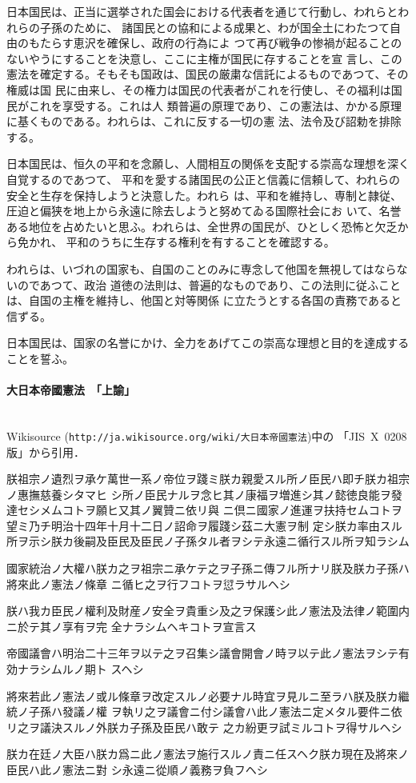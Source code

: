 \documentclass{ltjsarticle}
\begin{document}
{\selectfont
日本国民は、正当に選挙された国会における代表者を通じて行動し、われらとわれらの子孫のために、
諸国民との協和による成果と、わが国全土にわたつて自由のもたらす恵沢を確保し、政府の行為によ
つて再び戦争の惨禍が起ることのないやうにすることを決意し、ここに主権が国民に存することを宣
言し、この憲法を確定する。そもそも国政は、国民の厳粛な信託によるものであつて、その権威は国
民に由来し、その権力は国民の代表者がこれを行使し、その福利は国民がこれを享受する。これは人
類普遍の原理であり、この憲法は、かかる原理に基くものである。われらは、これに反する一切の憲
法、法令及び詔勅を排除する。

日本国民は、恒久の平和を念願し、人間相互の関係を支配する崇高な理想を深く自覚するのであつて、
平和を愛する諸国民の公正と信義に信頼して、われらの安全と生存を保持しようと決意した。われら
は、平和を維持し、専制と隷従、圧迫と偏狭を地上から永遠に除去しようと努めてゐる国際社会にお
いて、名誉ある地位を占めたいと思ふ。われらは、全世界の国民が、ひとしく恐怖と欠乏から免かれ、
平和のうちに生存する権利を有することを確認する。

われらは、いづれの国家も、自国のことのみに専念して他国を無視してはならないのであつて、政治
道徳の法則は、普遍的なものであり、この法則に従ふことは、自国の主権を維持し、他国と対等関係
に立たうとする各国の責務であると信ずる。

日本国民は、国家の名誉にかけ、全力をあげてこの崇高な理想と目的を達成することを誓ふ。
}

\paragraph{大日本帝國憲法　「上諭」}\ \\
Wikisource (\texttt{http://ja.wikisource.org/wiki/大日本帝國憲法})中の
「JIS~X~0208版」から引用．

\medskip

{\selectfont
朕祖宗ノ遺烈ヲ承ケ萬世一系ノ帝位ヲ踐ミ朕カ親愛スル所ノ臣民ハ即チ朕カ祖宗ノ惠撫慈養シタマヒ
シ所ノ臣民ナルヲ念ヒ其ノ康福ヲ増進シ其ノ懿徳良能ヲ發達セシメムコトヲ願ヒ又其ノ翼贊ニ依リ與
ニ倶ニ國家ノ進運ヲ扶持セムコトヲ望ミ乃チ明治十四年十月十二日ノ詔命ヲ履踐シ茲ニ大憲ヲ制
定シ朕カ率由スル所ヲ示シ朕カ後嗣及臣民及臣民ノ子孫タル者ヲシテ永遠ニ循行スル所ヲ知ラシム

國家統治ノ大權ハ朕カ之ヲ祖宗ニ承ケテ之ヲ子孫ニ傳フル所ナリ朕及朕カ子孫ハ將來此ノ憲法ノ條章
ニ循ヒ之ヲ行フコトヲ愆ラサルヘシ

朕ハ我カ臣民ノ權利及財産ノ安全ヲ貴重シ及之ヲ保護シ此ノ憲法及法律ノ範圍内ニ於テ其ノ享有ヲ完
全ナラシムヘキコトヲ宣言ス

帝國議會ハ明治二十三年ヲ以テ之ヲ召集シ議會開會ノ時ヲ以テ此ノ憲法ヲシテ有効ナラシムルノ期ト
スヘシ

將來若此ノ憲法ノ或ル條章ヲ改定スルノ必要ナル時宜ヲ見ルニ至ラハ朕及朕カ繼統ノ子孫ハ發議ノ權
ヲ執リ之ヲ議會ニ付シ議會ハ此ノ憲法ニ定メタル要件ニ依リ之ヲ議決スルノ外朕カ子孫及臣民ハ敢テ
之カ紛更ヲ試ミルコトヲ得サルヘシ

朕カ在廷ノ大臣ハ朕カ爲ニ此ノ憲法ヲ施行スルノ責ニ任スヘク朕カ現在及將來ノ臣民ハ此ノ憲法ニ對
シ永遠ニ從順ノ義務ヲ負フヘシ
}
\end{document}

